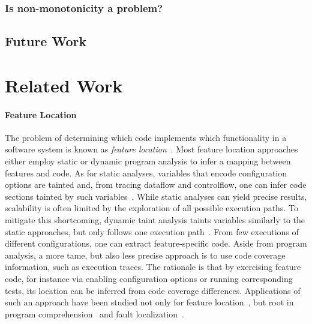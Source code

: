 {\subsubsection{Is non-monotonicity a problem?}

\subsection{Future Work}
\section{Related Work}\label{sec:related}
\paragraph*{Feature Location}\label{sec:feature_location}
The problem of determining which code implements which functionality in a software system is known as \emph{feature location}~\cite{rubin_feature_2013}. Most feature location approaches either employ static or dynamic program analysis to infer a mapping between features and code. As for static analyses, variables that encode configuration options are tainted and, from tracing dataflow and controlflow, one can infer code sections tainted by such variables~\cite{velez_2020_configcrusher_jase,lillack_2018_lotrack_tse,luo_2019_cova}.
While static analyses can yield precise results, scalability is often limited by the exploration of all possible execution paths. To mitigate this shortcoming, dynamic taint analysis taints variables similarly to the static approaches, but only follows one execution path~\cite{bell_phosphor_2014,velez_comprex_2021,splat_kim_2013}. From few executions of different configurations, one can extract feature-specific code. 
Aside from program analysis, a more tame, but also less precise approach is to use code coverage information, such as execution traces.
The rationale is that by exercising feature code, for instance via enabling configuration options or running corresponding tests, its location can be inferred from code coverage differences. Applications of such an approach have been studied not only for feature location~\cite{wong_integrated_2005,sulir_annotation_2015,michelon_spectrum_2021,perez_framing_2016}, but root in program comprehension~\cite{wilde_early_1996,wilde_reconnaissance_1995,sherwood_reducing_nodate,perez_diagnosis_2014,castro_pangolin_2019} and fault localization~\cite{agrawal_fault_1995,wong_faultloc_2016}. 

}
